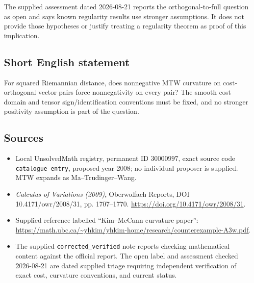 \documentclass[11pt]{article}
\begin{document}
The supplied assessment dated 2026-08-21 reports the orthogonal-to-full question as open and says known regularity results use stronger assumptions. It does not provide those hypotheses or justify treating a regularity theorem as proof of this implication.
\subsection{Short English statement}
For squared Riemannian distance, does nonnegative MTW curvature on cost-orthogonal vector pairs force nonnegativity on every pair? The smooth cost domain and tensor sign/identification conventions must be fixed, and no stronger positivity assumption is part of the question.
\subsection{Sources}
\begin{itemize}
\item Local UnsolvedMath registry, permanent ID \(30000997\), exact source code \texttt{catalogue entry}, proposed year 2008; no individual proposer is supplied. MTW expands as Ma--Trudinger--Wang.
\item \emph{Calculus of Variations (2009)}, Oberwolfach Reports, DOI 10.4171/owr/2008/31, pp. 1707--1770. \url{https://doi.org/10.4171/owr/2008/31}.
\item Supplied reference labelled ``Kim--McCann curvature paper'': \url{https://math.ubc.ca/~yhkim/yhkim-home/research/counterexample-A3w.pdf}.
\item The supplied \texttt{corrected\_verified} note reports checking mathematical content against the official report. The open label and assessment checked 2026-08-21 are dated supplied triage requiring independent verification of exact cost, curvature conventions, and current status.
\end{itemize}
\end{document}
